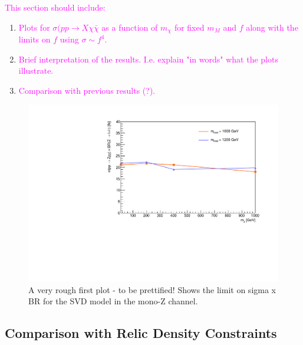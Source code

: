 \begin{flushleft}
\textcolor{magenta}{This section should include:}
\begin{enumerate}
\item \textcolor{magenta}{Plots for $\sigma(pp \rightarrow X \chi \bar{\chi}$ as a function of $m_{\chi}$ for fixed $m_{M}$ and $f$ along with the limits on $f$ using $\sigma \sim f^{4}$.}
\item \textcolor{magenta}{Brief interpretation of the results. I.e. explain "in words" what the plots illustrate.}
\item \textcolor{magenta}{Comparison with previous results (?).}
\end{enumerate}
\end{flushleft}

\begin{figure}
\begin{center}
\includegraphics[width=\textwidth]{figures/monoZ_sigma_limits_variedDMmass.pdf}
\caption{A very rough first plot - to be prettified! Shows the limit on sigma x BR for the SVD model in the mono-Z channel.}
\label{fig:MonoZ_SVD_limit}
\end{center}
\end{figure}

\subsection{Comparison with Relic Density Constraints}


